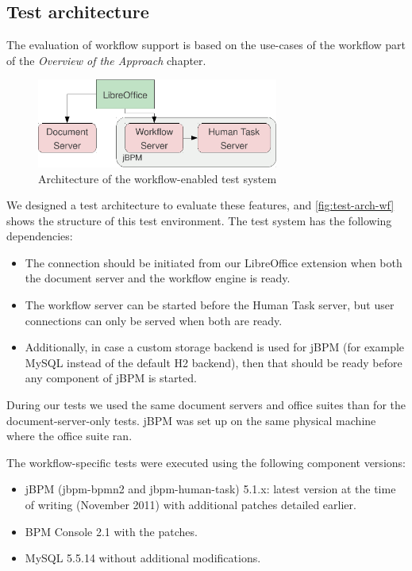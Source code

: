 \subsection*{Test architecture}

The evaluation of workflow support is based on the use-cases of the workflow
part of the \emph{Overview of the Approach} chapter.

\begin{figure}[H]
\centering
\includegraphics[width=300px,keepaspectratio]{test-arch-wf.pdf}
\caption{Architecture of the workflow-enabled test system}
\label{fig:test-arch-wf}
\end{figure}

We designed a test architecture to evaluate these features, and
\autoref{fig:test-arch-wf} shows the structure of this test environment. The
test system has the following dependencies:

\begin{itemize}
\item The connection should be initiated from our LibreOffice extension when
both the document server and the workflow engine is ready.
\item The workflow server can be started before the Human Task server, but user
connections can only be served when both are ready.
\item Additionally, in case a custom storage backend is used for jBPM (for
example MySQL instead of the default H2 backend), then that should be ready
before any component of jBPM is started.
\end{itemize}

During our tests we used the same document servers and office suites than for
the document-server-only tests. jBPM was set up on the same physical machine
where the office suite ran.

The workflow-specific tests were executed using the following component versions:

\begin{itemize}
\item jBPM (jbpm-bpmn2 and jbpm-human-task) 5.1.x: latest version at the time
of writing (November 2011) with additional patches detailed earlier.
\item BPM Console 2.1 with the patches.
\item MySQL 5.5.14 without additional modifications.
\end{itemize}


